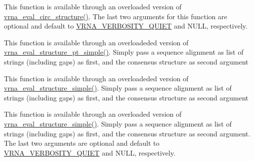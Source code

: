 \begin{DoxyRefList}
 This function is available through an overloaded version of \mbox{\hyperlink{group__eval_ga3e05a23ddf9b083f4e69881e440d4866}{vrna\+\_\+eval\+\_\+circ\+\_\+structure()}}. The last two arguments for this function are optional and default to \mbox{\hyperlink{group__eval_gaf4afe19780b61b4962c613bde324128b}{V\+R\+N\+A\+\_\+\+V\+E\+R\+B\+O\+S\+I\+T\+Y\+\_\+\+Q\+U\+I\+ET}} and N\+U\+LL, respectively.  
\item[Global \mbox{\hyperlink{group__eval_gabbb4d2a7aa324ec9cce8f47ce61ab8af}{vrna\+\_\+eval\+\_\+consensus\+\_\+structure\+\_\+pt\+\_\+simple}} (const char $\ast$$\ast$alignment, const short $\ast$pt)]\label{wrappers__wrappers000072}%
%
 This function is available through an overloadeded version of \mbox{\hyperlink{group__eval_ga0bba59b4d6e53461088666ff4aece7b0}{vrna\+\_\+eval\+\_\+structure\+\_\+pt\+\_\+simple()}}. Simply pass a sequence alignment as list of strings (including gaps) as first, and the consensus structure as second argument  
\item[Global \mbox{\hyperlink{group__eval_ga7762c3a7bdcbc3a14ef93259d322c7d6}{vrna\+\_\+eval\+\_\+consensus\+\_\+structure\+\_\+simple}} (const char $\ast$$\ast$alignment, const char $\ast$structure)]\label{wrappers__wrappers000057}%
%
 This function is available through an overloadeded version of \mbox{\hyperlink{group__eval_ga7e5273464b775d4130245681312c1369}{vrna\+\_\+eval\+\_\+structure\+\_\+simple()}}. Simply pass a sequence alignment as list of strings (including gaps) as first, and the consensus structure as second argument  
\item[Global \mbox{\hyperlink{group__eval_gad88927c62ab0a8b534e078e44be1b36e}{vrna\+\_\+eval\+\_\+consensus\+\_\+structure\+\_\+simple\+\_\+v}} (const char $\ast$$\ast$alignment, const char $\ast$structure, int verbosity\+\_\+level, F\+I\+LE $\ast$file)]\label{wrappers__wrappers000067}%
%
 This function is available through an overloaded version of \mbox{\hyperlink{group__eval_ga7e5273464b775d4130245681312c1369}{vrna\+\_\+eval\+\_\+structure\+\_\+simple()}}. Simply pass a sequence alignment as list of strings (including gaps) as first, and the consensus structure as second argument. The last two arguments are optional and default to \mbox{\hyperlink{group__eval_gaf4afe19780b61b4962c613bde324128b}{V\+R\+N\+A\+\_\+\+V\+E\+R\+B\+O\+S\+I\+T\+Y\+\_\+\+Q\+U\+I\+ET}} and N\+U\+LL, respectively.  
\item[Global \mbox{\hyperlink{group__eval_ga1c07851f6b665c3461a19e9e4eb33d26}{vrna\+\_\+eval\+\_\+consensus\+\_\+structure\+\_\+simple\+\_\+verbose}} (const char $\ast$$\ast$alignment, const char $\ast$structure, F\+I\+LE $\ast$file)]\label{wrappers__wrappers000062}%

\end{DoxyRefList}
